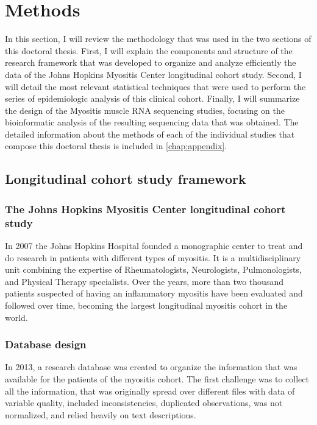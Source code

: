 \chapter{Methods}

In this section, I will review the methodology that was used in the two sections of this doctoral thesis. First, I will explain the components and structure of the research framework that was developed to organize and analyze efficiently the data of the Johns Hopkins Myositis Center longitudinal cohort study. Second, I will detail the most relevant statistical techniques that were used to perform the series of epidemiologic analysis of this clinical cohort. Finally, I will summarize the design of the Myositis muscle RNA sequencing studies, focusing on the bioinformatic analysis of the resulting sequencing data that was obtained. The detailed information about the methods of each of the individual studies that compose this doctoral thesis is included in \autoref{chap:appendix}.

\section{Longitudinal cohort study framework}

\subsection{The Johns Hopkins Myositis Center longitudinal cohort study}
In 2007 the Johns Hopkins Hospital founded a monographic center to treat and do research in patients with different types of myositis. It is a multidisciplinary unit combining the expertise of Rheumatologists, Neurologists, Pulmonologists, and Physical Therapy specialists. Over the years, more than two thousand patients suspected of having an inflammatory myositis have been evaluated and followed over time, becoming the largest longitudinal myositis cohort in the world.

\subsection{Database design}

In 2013, a research database was created to organize the information that was available for the patients of the myositis cohort. The first challenge was to collect all the information, that was originally spread over different files with data of variable quality, included inconsistencies, duplicated observations, was not normalized, and relied heavily on text descriptions.

